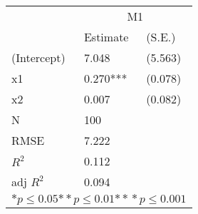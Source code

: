 \begin{tabular}{*{3}{l}}
\hline
                  & \multicolumn{2}{c}{M1}   \tabularnewline
                   &Estimate  &(S.E.)  \tabularnewline
 \hline
 \hline
   (Intercept)     &7.048   &   (5.563) \tabularnewline
   x1              &0.270***   &   (0.078) \tabularnewline
   x2              &0.007   &   (0.082) \tabularnewline
 \hline
 N                 &100       &        \tabularnewline
 RMSE             &7.222         & \tabularnewline
 $R^2$             &0.112         & \tabularnewline
 adj $R^2$         &0.094         & \tabularnewline
 \hline
\hline
 
 \multicolumn{3}{c}{${*  p}\le 0.05$${*\!\!*  p}\le 0.01$${*\!\!*\!\!*  p}\le 0.001$}\tabularnewline
 \end{tabular}